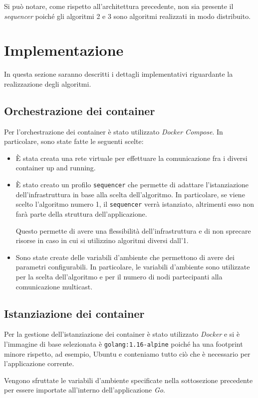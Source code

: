 \documentclass[acmtog]{acmart}
\begin{document}
Si può notare, come rispetto all'architettura precedente, non sia presente il \textit{sequencer} poiché gli algoritmi 2 e 3 sono algoritmi realizzati in modo distribuito.

\section{Implementazione}
In questa sezione saranno descritti i dettagli implementativi riguardante la realizzazione degli algoritmi.

\subsection{Orchestrazione dei container}
Per l'orchestrazione dei container è stato utilizzato \textit{Docker Compose}. In particolare, sono state fatte le seguenti scelte:
\begin{itemize}
\item È stata creata una rete virtuale per effettuare la comunicazione fra i diversi container up and running.
\item È stato creato un profilo \texttt{sequencer} che permette di adattare l'istanziazione dell'infrastruttura in base alla scelta dell'algoritmo. In particolare, se viene scelto l'algoritmo numero 1, il \texttt{sequencer} verrà istanziato, altrimenti esso non farà parte della struttura dell'applicazione.

Questo permette di avere una flessibilità dell'infrastruttura e di non sprecare risorse in caso in cui si utilizzino algoritmi diversi dall'1.
\item Sono state create delle variabili d'ambiente che permettono di avere dei parametri configurabili. In particolare, le variabili d'ambiente sono utilizzate per la scelta dell'algoritmo e per il numero di nodi partecipanti alla comunicazione multicast.
\end{itemize}

\subsection{Istanziazione dei container}
Per la gestione dell'istanziazione dei container è stato utilizzato \textit{Docker} e si è l'immagine di base selezionata è \texttt{golang:1.16-alpine} poiché ha una footprint minore rispetto, ad esempio, Ubuntu e conteniamo tutto ciò che è necessario per l'applicazione corrente.

Vengono sfruttate le variabili d'ambiente specificate nella sottosezione precedente per essere importate all'interno dell'applicazione \textit{Go}.
\end{document}
